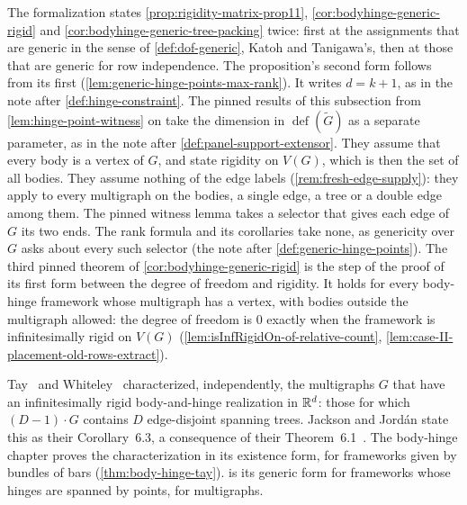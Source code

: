 \begin{fmlnote}
  The formalization states \cref{prop:rigidity-matrix-prop11},
  \cref{cor:bodyhinge-generic-rigid} and
  \cref{cor:bodyhinge-generic-tree-packing} twice: first at the assignments that are
  generic in the sense of \cref{def:dof-generic}, Katoh and Tanigawa's,
  then at those that are generic for row independence. The
  proposition's second form follows from its first
  (\cref{lem:generic-hinge-points-max-rank}). It writes $d = k + 1$, as
  in the note after
  \cref{def:hinge-constraint}. The pinned results of this subsection
  from \cref{lem:hinge-point-witness} on take the dimension in
  $\operatorname{def}(\tilde G)$ as a separate parameter, as in the
  note after \cref{def:panel-support-extensor}. They assume that every
  body is a vertex of $G$, and state rigidity on $V(G)$, which is then
  the set of all bodies. They assume nothing of the edge labels
  (\cref{rem:fresh-edge-supply}): they apply to every multigraph on the
  bodies, a single edge, a tree or a double edge among them. The pinned
  witness lemma takes a selector that gives
  each edge of $G$ its two ends. The rank formula and its corollaries
  take none, as genericity over $G$ asks about every such selector (the
  note after \cref{def:generic-hinge-points}). The third pinned theorem
  of \cref{cor:bodyhinge-generic-rigid} is the step of the proof of its
  first form between the degree of freedom and rigidity. It holds for
  every body-hinge framework whose multigraph has a vertex, with bodies
  outside the multigraph allowed: the degree of freedom is $0$ exactly
  when the framework is infinitesimally rigid on $V(G)$
  (\cref{lem:isInfRigidOn-of-relative-count},
  \cref{lem:case-II-placement-old-rows-extract}).
\end{fmlnote}

Tay~\cite[\S7]{tay1989} and Whiteley~\cite[Theorem~10]{whiteley1988}
characterized, independently, the multigraphs $G$ that have an
infinitesimally rigid body-and-hinge realization in ${\mathbb{R}}^d$: those for
which $(D-1) \cdot G$ contains $D$ edge-disjoint spanning trees.
Jackson and Jord\'an state this as their Corollary~6.3, a consequence
of their Theorem~6.1~\cite[\S6]{jacksonJordan2009}. The body-hinge
chapter proves the characterization in its existence form, for
frameworks given by bundles of bars (\cref{thm:body-hinge-tay}).
 is its generic form for
frameworks whose hinges are spanned by points, for multigraphs.
